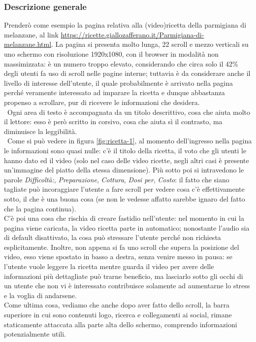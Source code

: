 \subsubsection{Descrizione generale}
\label{subsez:ricetta-descr}
Prenderò come esempio la pagina relativa alla (video)ricetta della parmigiana di melanzane, al link \url{https://ricette.giallozafferano.it/Parmigiana-di-melanzane.html}.
La pagina si presenta molto lunga, 22 scroll e mezzo verticali su uno schermo con risoluzione 1920x1080, con il browser in modalità non massimizzata: è un numero troppo elevato, considerando che circa solo il 42\% degli utenti fa uso di scroll nelle pagine interne; tuttavia è da considerare anche il livello di interesse dell'utente, il quale probabilmente è arrivato nella pagina perché veramente interessato ad imparare la ricetta e dunque abbastanza propenso a scrollare, pur di ricevere le informazioni che desidera.
\\~Ogni area di testo è accompagnata da un titolo descrittivo, cosa che aiuta molto il lettore: esso è però scritto in corsivo, cosa che aiuta sì il contrasto, ma diminuisce la leggibilità. 
\\~Come si può vedere in figura \ref{fig:ricetta-1}, al momento dell'ingresso nella pagina le informazioni sono quasi nulle: c'è il titolo della ricetta, il voto che gli utenti le hanno dato ed il video (solo nel caso delle video ricette, negli altri casi è presente un'immagine del piatto della stessa dimensione). Più sotto poi si intravedono le parole \textit{Difficoltà:}, \textit{Preparazione}, \textit{Cottura}, \textit{Dosi per}, \textit{Costo}: il fatto che siano tagliate può incoraggiare l'utente a fare scroll per vedere cosa c'è effettivamente sotto, il che è una buona cosa (se non le vedesse affatto sarebbe ignaro del fatto che la pagina continua). 
~\\C'è poi una cosa che rischia di creare fastidio nell'utente: nel momento in cui la pagina viene caricata, la video ricetta parte in automatico; nonostante l'audio sia di default disattivato, la cosa può stressare l'utente perché non richiesta esplicitamente. Inoltre, non appena si fa uno scroll che supera la posizione del video, esso viene spostato in basso a destra, senza venire messo in pausa: se l'utente vuole leggere la ricetta mentre guarda il video per avere delle informazioni più dettagliate può trarne beneficio, ma lasciarlo sotto gli occhi di un utente che non vi è interessato contribuisce solamente ad aumentarne lo stress e la voglia di andarsene.
~\\Come ultima cosa, vediamo che anche dopo aver fatto dello scroll, la barra superiore in cui sono contenuti logo, ricerca e collegamenti ai social, rimane staticamente attaccata alla parte alta dello schermo, comprendo informazioni potenzialmente utili.

